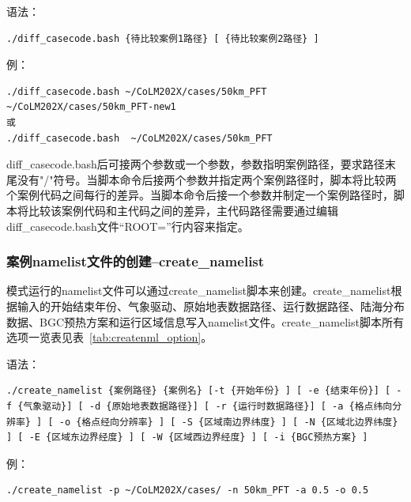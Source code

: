 \documentclass[a4paper,12pt,twoside]{article}
\begin{document}
语法：

\begin{lstlisting}
./diff_casecode.bash {待比较案例1路径} [ {待比较案例2路径} ] 
\end{lstlisting}

例：
\begin{lstlisting}
./diff_casecode.bash ~/CoLM202X/cases/50km_PFT ~/CoLM202X/cases/50km_PFT-new1
或
./diff_casecode.bash  ~/CoLM202X/cases/50km_PFT
\end{lstlisting}

diff\_casecode.bash后可接两个参数或一个参数，参数指明案例路径，要求路径末尾没有"/"符号。当脚本命令后接两个参数并指定两个案例路径时，脚本将比较两个案例代码之间每行的差异。当脚本命令后接一个参数并制定一个案例路径时，脚本将比较该案例代码和主代码之间的差异，主代码路径需要通过编辑diff\_casecode.bash文件“ROOT=”行内容来指定。

\subsubsection{案例namelist文件的创建--create\_namelist}

模式运行的namelist文件可以通过create\_namelist脚本来创建。create\_namelist根据输入的开始结束年份、气象驱动、原始地表数据路径、运行数据路径、陆海分布数据、BGC预热方案和运行区域信息写入namelist文件。create\_namelist脚本所有选项一览表见表~\ref{tab:createnml_option}。

语法：
\begin{lstlisting}
./create_namelist {案例路径} {案例名} [-t {开始年份} ] [ -e {结束年份}] [ -f {气象驱动}] [ -d {原始地表数据路径}] [ -r {运行时数据路径}] [ -a {格点纬向分辨率} ] [ -o {格点经向分辨率} ] [ -S {区域南边界纬度} ] [ -N {区域北边界纬度} ] [ -E {区域东边界经度} ] [ -W {区域西边界经度} ] [ -i {BGC预热方案} ]
\end{lstlisting}

例：
\begin{lstlisting}
./create_namelist -p ~/CoLM202X/cases/ -n 50km_PFT -a 0.5 -o 0.5
\end{lstlisting}
\end{document}
